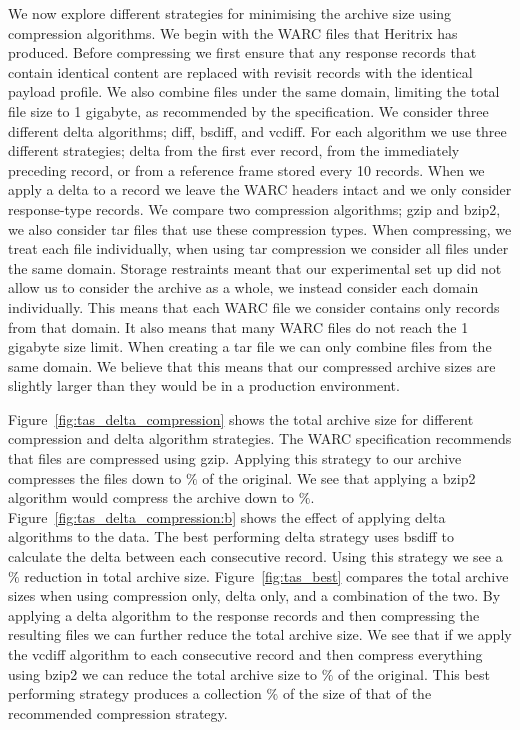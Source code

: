 \documentclass[11pt]{article}
\begin{document}
We now explore different strategies for minimising the archive size using compression algorithms. We begin with the WARC files that Heritrix has produced. Before compressing we first ensure that any response records that contain identical content are replaced with revisit records with the identical payload profile. We also combine files under the same domain, limiting the total file size to 1 gigabyte, as recommended by the specification. We consider three different delta algorithms; diff, bsdiff, and vcdiff. For each algorithm we use three different strategies; delta from the first ever record, from the immediately preceding record, or from a reference frame stored every 10 records. When we apply a delta to a record we leave the WARC headers intact and we only consider response-type records. We compare two compression algorithms; gzip and bzip2, we also consider tar files that use these compression types. When compressing, we treat each file individually, when using tar compression we consider all files under the same domain. Storage restraints meant that our experimental set up did not allow us to consider the archive as a whole, we instead consider each domain individually. This means that each WARC file we consider contains only records from that domain. It also means that many WARC files do not reach the 1 gigabyte size limit. When creating a tar file we can only combine files from the same domain. We believe that this means that our compressed archive sizes are slightly larger than they would be in a production environment.

Figure~\ref{fig:tas_delta_compression} shows the total archive size for different compression and delta algorithm strategies. The WARC specification recommends that files are compressed using gzip. Applying this strategy to our archive compresses the files down to $\%$ of the original. We see that applying a bzip2 algorithm would compress the archive down to $\%$. Figure~\ref{fig:tas_delta_compression:b} shows the effect of applying delta algorithms to the data. The best performing delta strategy uses bsdiff to calculate the delta between each consecutive record. Using this strategy we see a $\%$ reduction in total archive size. Figure~\ref{fig:tas_best} compares the total archive sizes when using compression only, delta only, and a combination of the two. By applying a delta algorithm to the response records and then compressing the resulting files we can further reduce the total archive size. We see that if we apply the vcdiff algorithm to each consecutive record and then compress everything using bzip2 we can reduce the total archive size to $\%$ of the original. This best performing strategy produces a collection $\%$ of the size of that of the recommended compression strategy.
\end{document}
